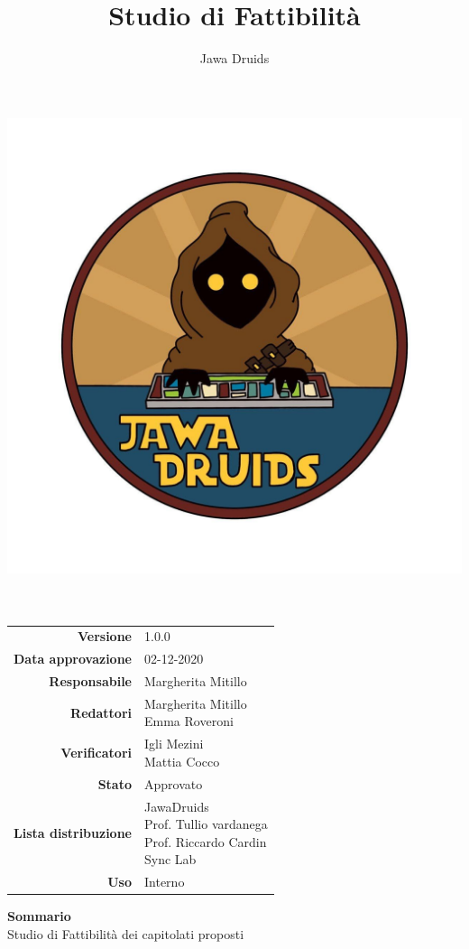 



	
	\makeatletter
	\begin{titlepage}
		\begin{center}
			\vspace*{-5cm}
			\author{Jawa Druids} 
			\title{Studio di Fattibilità}
			\date{} %
			\includegraphics[width=0.5\linewidth]{../immagini/DRUIDSLOGO.jpg}\\[4ex]
			{\huge \bfseries  \@title }\\[2ex] 
			{\LARGE  \@author}\\[50ex]
			\vspace*{-9cm}
			\begin{table}[H]
				\renewcommand{\arraystretch}{1.4}
				\centering
				\begin{tabular}{r | l}
					\textbf{Versione} & 1.0.0 \\%
					\textbf{Data approvazione} & 02-12-2020\\
					\textbf{Responsabile} & Margherita Mitillo \\
					\textbf{Redattori} & \makecell[tl]{Margherita Mitillo \\ Emma Roveroni} \\
					\textbf{Verificatori} & \makecell[tl]{Igli Mezini \\ Mattia Cocco} \\
					\textbf{Stato} & Approvato\\
					\textbf{Lista distribuzione} & \makecell[tl]{JawaDruids \\ Prof. Tullio vardanega \\ Prof. Riccardo Cardin \\ Sync Lab}\\
					\textbf{Uso} & Interno
				\end{tabular}
			\end{table}
			\vspace{0.1cm}
			\hfill \break
			\fontsize{17}{10}\textbf{Sommario} \\
			\vspace{0.1cm}
			Studio di Fattibilità dei capitolati proposti 
		\end{center}
	\end{titlepage}
	\makeatother
	
